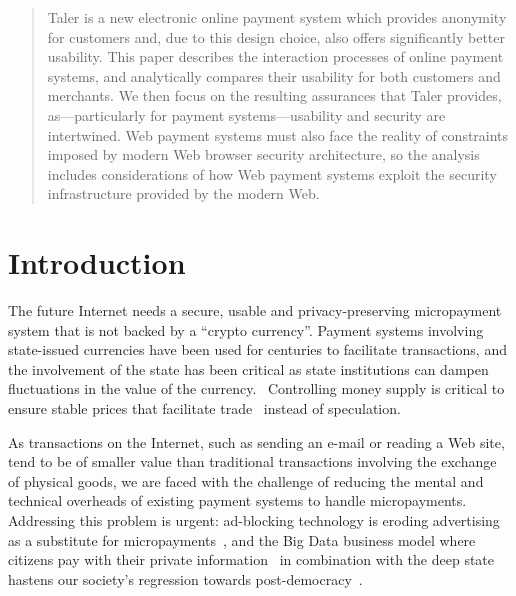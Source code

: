 \documentclass{IEEEtran}
\begin{document}
\maketitle

\begin{abstract}
Taler is a new electronic online payment system which provides
anonymity for customers and, due to this design choice, also offers
significantly better usability.  This paper describes the interaction
processes of online payment systems, and analytically compares their
usability for both customers and merchants.  We then focus on the
resulting assurances that Taler provides, as---particularly for payment
systems---usability and security are intertwined.  Web payment systems
must also face the reality of constraints imposed by modern Web
browser security architecture, so the analysis includes considerations of
how Web payment systems exploit the security infrastructure provided
by the modern Web.
\end{abstract}

\section{Introduction}

The future Internet needs a secure, usable and privacy-preserving
micropayment system that is not backed by a ``crypto currency''.
Payment systems involving state-issued currencies have been used for
centuries to facilitate transactions, and the involvement of the state
has been critical as state institutions can dampen fluctuations in the
value of the currency.~\cite{dominguez1993} Controlling money supply
is critical to ensure stable prices that facilitate
trade~\cite{quantitytheory1997volckart} instead of speculation.\cite{lewis_btc_is_junk}

As transactions on the Internet, such as sending an e-mail or reading
a Web site, tend to be of smaller value than traditional transactions
involving the exchange of physical goods, we are faced with the
challenge of reducing the mental and technical overheads of existing
payment systems to handle micropayments.  Addressing this problem is
urgent: ad-blocking technology is eroding advertising as a substitute
for micropayments~\cite{adblockblocks}, and the Big Data business
model where citizens pay with their private
information~\cite{ehrenberg2014data} in combination with the deep
state hastens our society's regression towards
post-democracy~\cite{rms2013democracy}.
\end{document}
